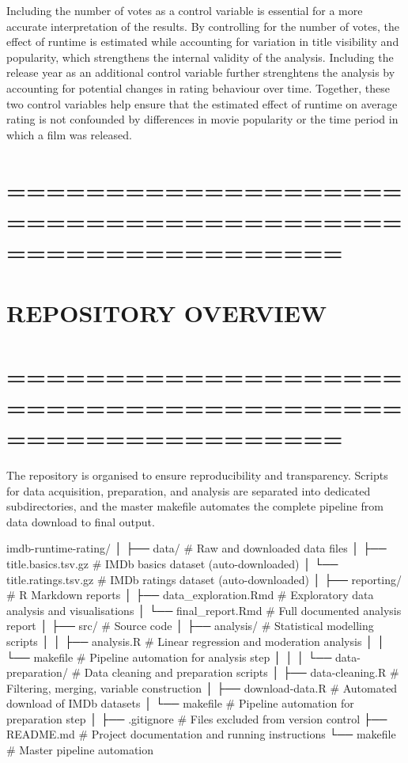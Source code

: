 \documentclass[
]{article}
\begin{document}
Including the number of votes as a control variable is essential for a
more accurate interpretation of the results. By controlling for the
number of votes, the effect of runtime is estimated while accounting for
variation in title visibility and popularity, which strengthens the
internal validity of the analysis. Including the release year as an
additional control variable further strenghtens the analysis by
accounting for potential changes in rating behaviour over time.
Together, these two control variables help ensure that the estimated
effect of runtime on average rating is not confounded by differences in
movie popularity or the time period in which a film was released.

\section{=========================================================}\label{section-14}

\section{REPOSITORY OVERVIEW}\label{repository-overview}

\section{=========================================================}\label{section-15}

The repository is organised to ensure reproducibility and transparency.
Scripts for data acquisition, preparation, and analysis are separated
into dedicated subdirectories, and the master makefile automates the
complete pipeline from data download to final output.

imdb-runtime-rating/ │ ├── data/ \# Raw and downloaded data files │ ├──
title.basics.tsv.gz \# IMDb basics dataset (auto-downloaded) │ └──
title.ratings.tsv.gz \# IMDb ratings dataset (auto-downloaded) │ ├──
reporting/ \# R Markdown reports │ ├── data\_exploration.Rmd \#
Exploratory data analysis and visualisations │ └── final\_report.Rmd \#
Full documented analysis report │ ├── src/ \# Source code │ ├──
analysis/ \# Statistical modelling scripts │ │ ├── analysis.R \# Linear
regression and moderation analysis │ │ └── makefile \# Pipeline
automation for analysis step │ │ │ └── data-preparation/ \# Data
cleaning and preparation scripts │ ├── data-cleaning.R \# Filtering,
merging, variable construction │ ├── download-data.R \# Automated
download of IMDb datasets │ └── makefile \# Pipeline automation for
preparation step │ ├── .gitignore \# Files excluded from version control
├── README.md \# Project documentation and running instructions └──
makefile \# Master pipeline automation
\end{document}
